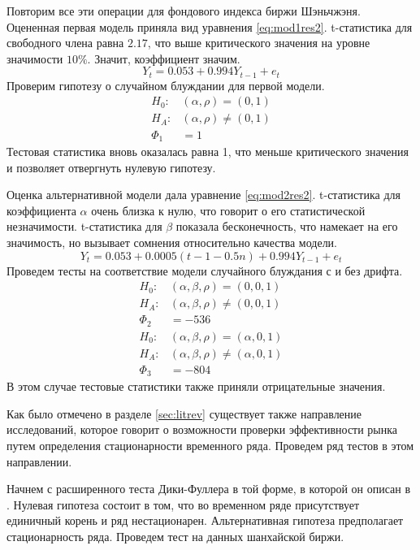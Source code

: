 \documentclass[a4paper,12pt]{article}
\begin{document}
Повторим все эти операции для фондового индекса биржи Шэньчжэня. Оцененная первая модель приняла вид уравнения \ref{eq:mod1res2}. t-статистика для свободного члена равна $2.17$, что выше критического значения на уровне значимости $10\%$. Значит, коэффициент значим.
\begin{equation}
  \label{eq:mod1res2}
  Y_t=0.053+0.994Y_{t-1}+e_t
\end{equation}
Проверим гипотезу о случайном блуждании для первой модели.
\begin{align}
  H_0:&(\alpha,\rho)=(0,1)\\
  H_A:&(\alpha,\rho)\neq(0,1)\\
  \Phi_1&=1
\end{align}
Тестовая статистика вновь оказалась равна 1, что меньше критического значения и позволяет отвергнуть нулевую гипотезу.

Оценка альтернативной модели дала уравнение \ref{eq:mod2res2}. t-статистика для коэффициента $\alpha$ очень близка к нулю, что говорит о его статистической незначимости. t-статистика для $\beta$ показала бесконечность, что намекает на его значимость, но вызывает сомнения относительно качества модели.
\begin{equation}
  \label{eq:mod2res2}
  Y_t=0.053+0.0005(t-1-0.5n)+0.994Y_{t-1}+e_t
\end{equation}
Проведем тесты на соответствие модели случайного блуждания с и без дрифта.
\begin{align}
  H_0:&(\alpha, \beta, \rho)=(0,0,1)\\
  H_A:&(\alpha,\beta, \rho)\neq(0,0,1)\\
  \Phi_2&=-536\\
  H_0:&(\alpha, \beta, \rho)=(\alpha,0,1)\\
  H_A:&(\alpha,\beta, \rho)\neq(\alpha,0,1)\\
  \Phi_3&=-804
\end{align}
В этом случае тестовые статистики также приняли отрицательные значения.

Как было отмечено в разделе \ref{sec:litrev} существует также направление исследований, которое говорит о возможности проверки эффективности рынка путем определения стационарности временного ряда. Проведем ряд тестов в этом направлении.

Начнем с расширенного теста Дики-Фуллера в той форме, в которой он описан в \cite{fuller2009}. Нулевая гипотеза состоит в том, что во временном ряде присутствует единичный корень и ряд нестационарен. Альтернативная гипотеза предполагает стационарность ряда. Проведем тест на данных шанхайской биржи.
\end{document}

